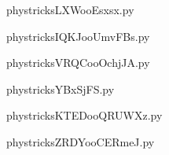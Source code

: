 
    \newcommand{\CaptionFigLXWooEsxsx}{<+Type your caption here+>}
    \begin{center}
        
    \end{center}
    phystricksLXWooEsxsx.py

    

    \clearpage
    


    \newcommand{\CaptionFigIQKJooUmvFBs}{<+Type your caption here+>}
    \begin{center}
        
    \end{center}
    phystricksIQKJooUmvFBs.py

    

    \clearpage
    


    \newcommand{\CaptionFigVRQCooOchjJA}{<+Type your caption here+>}
    \begin{center}
        
    \end{center}
    phystricksVRQCooOchjJA.py

    

    \clearpage
    


    \newcommand{\CaptionFigYBxSjFS}{<+Type your caption here+>}
    \begin{center}
        
    \end{center}
    phystricksYBxSjFS.py

    

    \clearpage
    


    \newcommand{\CaptionFigKTEDooQRUWXz}{<+Type your caption here+>}
    \begin{center}
        
    \end{center}
    phystricksKTEDooQRUWXz.py

    

    \clearpage
    


    \newcommand{\CaptionFigZRDYooCERmeJ}{<+Type your caption here+>}
    \begin{center}
        
    \end{center}
    phystricksZRDYooCERmeJ.py

